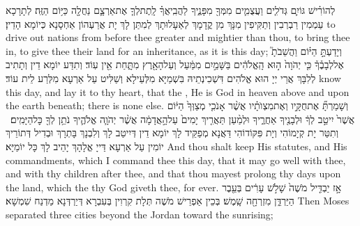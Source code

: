 {לְהוֹרִ֗ישׁ גּוֹיִ֛ם גְּדֹלִ֧ים וַעֲצֻמִ֛ים מִמְּךָ֖ מִפָּנֶ֑יךָ לַהֲבִֽיאֲךָ֗ לָֽתֶת\maqqaf לְךָ֧ אֶת\maqqaf אַרְצָ֛ם נַחֲלָ֖ה כַּיּ֥וֹם הַזֶּֽה׃}
{לְתָרָכָא עַמְמִין רַבְרְבִין וְתַקִּיפִין מִנָּךְ מִן קֳדָמָךְ לְאַעָלוּתָךְ לְמִתַּן לָךְ יָת אֲרַעְהוֹן אַחְסָנָא כְּיוֹמָא הָדֵין׃}
{to drive out nations from before thee greater and mightier than thou, to bring thee in, to give thee their land for an inheritance, as it is this day;}{}
{וְיָדַעְתָּ֣ הַיּ֗וֹם וַהֲשֵׁבֹתָ֮ אֶל\maqqaf לְבָבֶ֒ךָ֒ כִּ֤י יְהֹוָה֙ ה֣וּא הָֽאֱלֹהִ֔ים בַּשָּׁמַ֣יִם מִמַּ֔עַל וְעַל\maqqaf הָאָ֖רֶץ מִתָּ֑חַת אֵ֖ין עֽוֹד׃}
{וְתִדַּע יוֹמָא דֵין וְתָתִיב לְלִבָּךְ אֲרֵי יְיָ הוּא אֱלֹהִים דִּשְׁכִינְתֵיהּ בִּשְׁמַיָּא מִלְּעֵילָא וְשַׁלִּיט עַל אַרְעָא מִלְּרַע לֵית עוֹד׃}
{know this day, and lay it to thy heart, that the \lord, He is God in heaven above and upon the earth beneath; there is none else.}{}
{וְשָׁמַרְתָּ֞ אֶת\maqqaf חֻקָּ֣יו וְאֶת\maqqaf מִצְוֺתָ֗יו אֲשֶׁ֨ר אָנֹכִ֤י מְצַוְּךָ֙ הַיּ֔וֹם אֲשֶׁר֙ יִיטַ֣ב לְךָ֔ וּלְבָנֶ֖יךָ אַחֲרֶ֑יךָ וּלְמַ֨עַן תַּאֲרִ֤יךְ יָמִים֙ עַל\maqqaf הָ֣אֲדָמָ֔ה אֲשֶׁ֨ר יְהֹוָ֧ה אֱלֹהֶ֛יךָ נֹתֵ֥ן לְךָ֖ כׇּל\maqqaf הַיָּמִֽים׃ \petucha }
{וְתִטַּר יָת קְיָמוֹהִי וְיָת פִּקּוֹדוֹהִי דַּאֲנָא מְפַקֵּיד לָךְ יוֹמָא דֵין דְּיִיטַב לָךְ וְלִבְנָךְ בָּתְרָךְ וּבְדִיל דְּתוֹרֵיךְ יוֹמִין עַל אַרְעָא דַּייָ אֱלָהָךְ יָהֵיב לָךְ כָּל יוֹמַיָּא׃}
{And thou shalt keep His statutes, and His commandments, which I command thee this day, that it may go well with thee, and with thy children after thee, and that thou mayest prolong thy days upon the land, which the \lord\space thy God giveth thee, for ever.}{}
\newseder
{}%
{אָ֣ז יַבְדִּ֤יל מֹשֶׁה֙ שָׁלֹ֣שׁ עָרִ֔ים בְּעֵ֖בֶר הַיַּרְדֵּ֑ן מִזְרְחָ֖ה שָֽׁמֶשׁ׃}
{בְּכֵין אַפְרֵישׁ מֹשֶׁה תְּלָת קִרְוִין בְּעִבְרָא דְּיַרְדְּנָא מַדְנַח שִׁמְשָׁא׃}
{Then Moses separated three cities beyond the Jordan toward the sunrising;}{}
